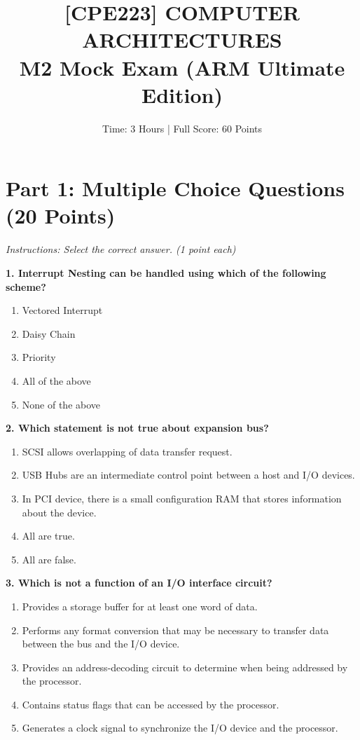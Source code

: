 \documentclass[12pt]{article}
\title{\textbf{[CPE223] COMPUTER ARCHITECTURES \\ M2 Mock Exam (ARM Ultimate Edition)}}
\author{Time: 3 Hours | Full Score: 60 Points}
\date{}
\begin{document}
\maketitle

\section*{Part 1: Multiple Choice Questions (20 Points)}
\textit{Instructions: Select the correct answer. (1 point each)}

\textbf{1. Interrupt Nesting can be handled using which of the following scheme?}
\begin{enumerate}[label=\Alph*.]
    \item Vectored Interrupt
    \item Daisy Chain
    \item Priority
    \item All of the above
    \item None of the above
\end{enumerate}

\textbf{2. Which statement is not true about expansion bus?}
\begin{enumerate}[label=\Alph*.]
    \item SCSI allows overlapping of data transfer request.
    \item USB Hubs are an intermediate control point between a host and I/O devices.
    \item In PCI device, there is a small configuration RAM that stores information about the device.
    \item All are true.
    \item All are false.
\end{enumerate}

\textbf{3. Which is not a function of an I/O interface circuit?}
\begin{enumerate}[label=\Alph*.]
    \item Provides a storage buffer for at least one word of data.
    \item Performs any format conversion that may be necessary to transfer data between the bus and the I/O device.
    \item Provides an address-decoding circuit to determine when being addressed by the processor.
    \item Contains status flags that can be accessed by the processor.
    \item Generates a clock signal to synchronize the I/O device and the processor.
\end{enumerate}
\end{document}
